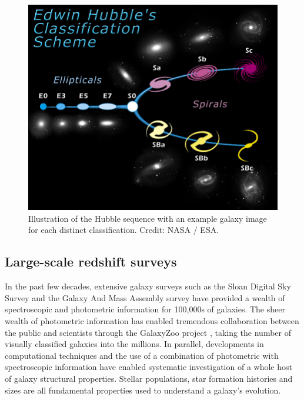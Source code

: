 \begin{figure}
	\includegraphics[width=\linewidth]{thesis/latex/introduction/hubble_tuning_fork.jpg}
    \caption{Illustration of the Hubble sequence with an example galaxy image for each distinct classification. Credit: NASA / ESA.}
    \label{fig:hubble_fork}
\end{figure}

\subsection{Large-scale redshift surveys}
In the past few decades, extensive galaxy surveys such as the Sloan Digital Sky Survey \citep[SDSS,][]{york2000} and the Galaxy And Mass Assembly survey \citep[][]{driver2009} have provided a wealth of spectroscopic and photometric information for 100,000s of galaxies. The sheer wealth of photometric information has enabled tremendous collaboration between the public and scientists through the GalaxyZoo project \citep[e.g.][]{lintott2008, lintott2011, willett2013}, taking the number of visually classified galaxies into the millions. In parallel, developments in computational techniques and the use of a combination of photometric with spectroscopic information have enabled systematic investigation of a whole host of galaxy structural properties. Stellar populations, star formation histories and sizes are all fundamental properties used to understand a galaxy's evolution. 

